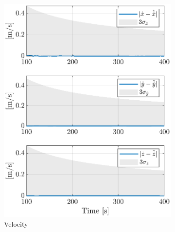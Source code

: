 \begin{figure}[!h]
    \begin{subfigure}[b]{0.48\textwidth}
    \centering
    \includegraphics[clip,trim = 0cm 0cm 0cm 0cm,width=\linewidth]{Images/sigma_vel.eps}
    \caption{Velocity}
    \label{fig:sigmavel}
    \end{subfigure}\hfill
    \begin{subfigure}[b]{0.48\textwidth}
    \centering

\end{subfigure}
\end{figure}
